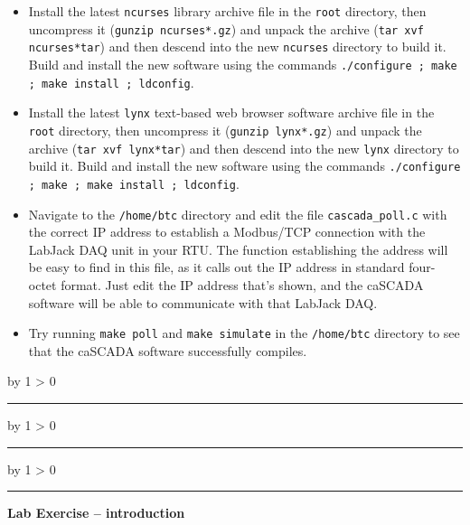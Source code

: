 \documentclass[12pt,a4paper]{article}
\def\oppgave{
            \advance\questnum by 1
            \ifnum \questnum > 0
                 \hrule
                 \vskip 3pt
                 \leftline{Oppgave \the\questnum}
                 \vskip 3pt \fi}
\def\svar{
           \advance\answnum by 1
           \ifnum \answnum > 0
                \hrule
                \vskip 3pt
                \leftline{Svar \the\answnum}
                \vskip 3pt \fi}
\def\notes{
           \advance\explnum by 1
           \ifnum \explnum > 0
                \hrule
                \vskip 3pt
                \leftline{Notes \the\explnum}
                \vskip 3pt \fi}
\begin{document}
\begin{itemize}
\begin{itemize}
\vskip 5pt
\item{} Install the latest {\tt ncurses} library archive file in the {\tt root} directory, then uncompress it ({\tt gunzip ncurses*.gz}) and unpack the archive ({\tt tar xvf ncurses*tar}) and then descend into the new {\tt ncurses} directory to build it.  Build and install the new software using the commands {\tt ./configure ; make ; make install ; ldconfig}.
\vskip 5pt
\item{} Install the latest {\tt lynx} text-based web browser software archive file in the {\tt root} directory, then uncompress it ({\tt gunzip lynx*.gz}) and unpack the archive ({\tt tar xvf lynx*tar}) and then descend into the new {\tt lynx} directory to build it.  Build and install the new software using the commands {\tt ./configure ; make ; make install ; ldconfig}.
\vskip 5pt
\item{} Navigate to the {\tt /home/btc} directory and edit the file {\tt cascada\_poll.c} with the correct IP address to establish a Modbus/TCP connection with the LabJack DAQ unit in your RTU.  The function establishing the address will be easy to find in this file, as it calls out the IP address in standard four-octet format.  Just edit the IP address that's shown, and the caSCADA software will be able to communicate with that LabJack DAQ.
\vskip 5pt
\item{} Try running {\tt make poll} and {\tt make simulate} in the {\tt /home/btc} directory to see that the caSCADA software successfully compiles.
\end{itemize}




\vskip 10pt \filbreak 





\svar{} 


\vskip 10pt \filbreak 





\notes{} 



\vfil \eject 



\oppgave{} 

\noindent
{\bf Lab Exercise -- introduction}


\end{itemize}
\end{document}
